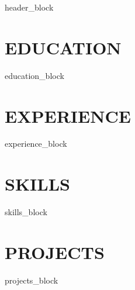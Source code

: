 \documentclass[11pt,a4paper]{article}
\begin{document}
\begin{center}
{header_block}
\end{center}

\vspace{0.5cm}

\section*{EDUCATION}
{education_block}

\section*{EXPERIENCE}
{experience_block}

\section*{SKILLS}
{skills_block}

\section*{PROJECTS}
{projects_block}
\end{document}
